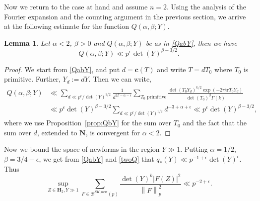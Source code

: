 \documentclass[11pt]{amsart}
\numberwithin{equation}{section}
\theoremstyle{plain}
\newtheorem{lem}[thm]{Lemma}
\theoremstyle{definition}
\newcommand{\propref}[1]{Proposition~\ref{#1}}
\newcommand{\mf}{\mathbf}
\newcommand{\mc}{\mathcal}
\newcommand{\tr}{\mathrm{tr}}
\newcommand*{\norm}[1]{\left\lVert#1\right\rVert}
\newcommand{\sumn}{\sum \nolimits}
\begin{document}
Now we return to the case at hand and assume $n=2$. Using the analysis of the Fourier expansion and the counting argument in the previous section, we arrive at the following estimate for the function $Q(\alpha,\beta;Y)$. 
\begin{lem}\label{lem:QabY}
    Let $\alpha< 2$, $\beta>0$ and $Q(\alpha,\beta;Y)$ be as in \eqref{QabY}, then we have
    \begin{equation}
        Q(\alpha,\beta;Y)\ll p^{\epsilon} \det(Y)^{\beta-3/2}.
    \end{equation}
\end{lem}
\begin{proof}
We start from \eqref{QabY}, and put $d=\mf c(T)$ and write $T=dT_0$ where $T_0$ is primitive. Further, $Y_d:= dY$. Then we can write,
\begin{align}
    Q(\alpha, \beta; Y) & \ll \sumn_{d\ll p^\epsilon/\det (Y)^{1/2}} \frac{1}{d^{ 2 \beta - \alpha - \epsilon}} \sumn_{T_0 \text{ primitive}} \frac{\det(T_0 Y_d)^{k/2}  \exp(- 2 \pi \tr T_0Y_d)}{ \det(T_0)^\beta \Gamma(k)}\\
    & \ll p^{\epsilon} \det(Y)^{\beta-3/2}\sumn_{d\ll p^\epsilon/\det (Y)^{1/2}} d^{-3+\alpha+\epsilon}\ll p^{\epsilon} \det(Y)^{\beta-3/2},
\end{align}
where we use \propref{prop:QbY} for the sum over $T_0$ and the fact that the sum over $d$, extended to $\mf N$, is convergent for $\alpha< 2$.\qedhere
\end{proof}
%
Now we bound the space of newforms in the region $Y\gg 1$. 
Putting $\alpha=1/2$, $\beta= 3/4-\epsilon$, we get from \eqref{QabY} and \eqref{twoQ} that
$\displaystyle q_*(Y)\ll p^{-1+\epsilon}\det(Y)^{\epsilon}$.
Thus
\begin{equation} \label{new-type0}
    \sup_{Z \in \mf H_2, Y \gg 1}\sum_{F \in \mc B^{SK, new}(p)}  \frac{\det(Y)^k |F(Z)|^2}{\norm{F}^2_p} \ll p^{-2+\epsilon}.
\end{equation}
\end{document}
